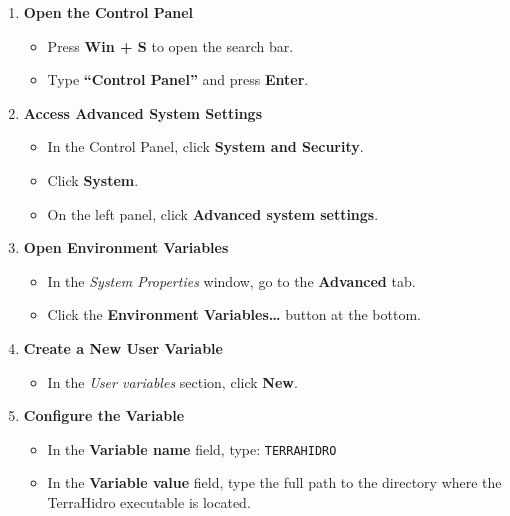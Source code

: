 \documentclass[
]{book}
\providecommand{\tightlist}{%
  \setlength{\itemsep}{0pt}\setlength{\parskip}{0pt}}
\begin{document}
\begin{enumerate}
\def\labelenumi{\arabic{enumi}.}
\tightlist
\item
  \textbf{Open the Control Panel}

  \begin{itemize}
  \tightlist
  \item
    Press \textbf{Win + S} to open the search bar.\\
  \item
    Type \textbf{``Control Panel''} and press \textbf{Enter}.
  \end{itemize}
\item
  \textbf{Access Advanced System Settings}

  \begin{itemize}
  \tightlist
  \item
    In the Control Panel, click \textbf{System and Security}.\\
  \item
    Click \textbf{System}.\\
  \item
    On the left panel, click \textbf{Advanced system settings}.
  \end{itemize}
\item
  \textbf{Open Environment Variables}

  \begin{itemize}
  \tightlist
  \item
    In the \emph{System Properties} window, go to the \textbf{Advanced} tab.\\
  \item
    Click the \textbf{Environment Variables\ldots{}} button at the bottom.
  \end{itemize}
\item
  \textbf{Create a New User Variable}

  \begin{itemize}
  \tightlist
  \item
    In the \emph{User variables} section, click \textbf{New}.
  \end{itemize}
\item
  \textbf{Configure the Variable}

  \begin{itemize}
  \tightlist
  \item
    In the \textbf{Variable name} field, type: \texttt{TERRAHIDRO}\\
  \item
    In the \textbf{Variable value} field, type the full path to the directory where the TerraHidro executable is located.


\end{itemize}
\end{enumerate}
\end{document}
